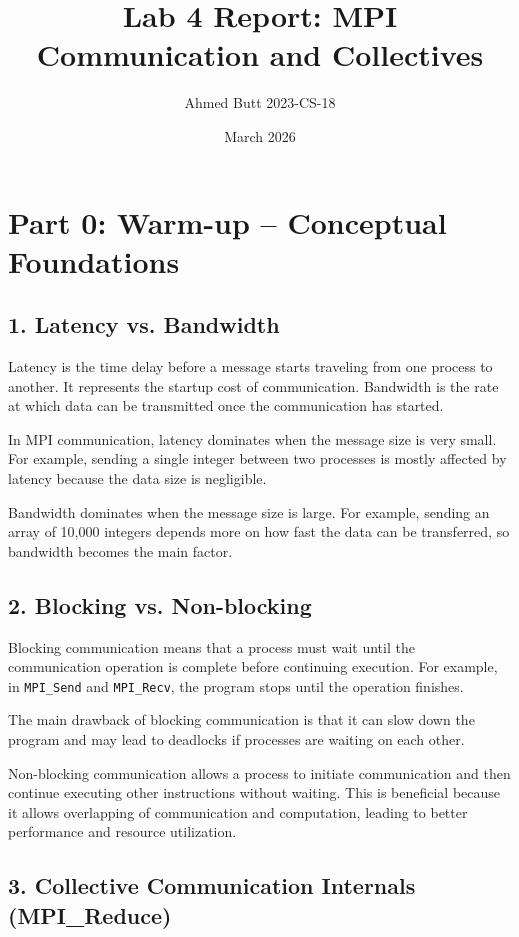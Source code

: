 \documentclass[a4paper,12pt]{article}
\title{Lab 4 Report: MPI Communication and Collectives}
\author{Ahmed Butt 2023-CS-18}
\date{March 2026}
\begin{document}
\maketitle
\section{Part 0: Warm-up -- Conceptual Foundations}

\subsection{1. Latency vs. Bandwidth}

Latency is the time delay before a message starts traveling from one process to another. It represents the startup cost of communication. Bandwidth is the rate at which data can be transmitted once the communication has started.

In MPI communication, latency dominates when the message size is very small. For example, sending a single integer between two processes is mostly affected by latency because the data size is negligible.

Bandwidth dominates when the message size is large. For example, sending an array of 10,000 integers depends more on how fast the data can be transferred, so bandwidth becomes the main factor.

\subsection{2. Blocking vs. Non-blocking}

Blocking communication means that a process must wait until the communication operation is complete before continuing execution. For example, in \texttt{MPI\_Send} and \texttt{MPI\_Recv}, the program stops until the operation finishes.

The main drawback of blocking communication is that it can slow down the program and may lead to deadlocks if processes are waiting on each other.

Non-blocking communication allows a process to initiate communication and then continue executing other instructions without waiting. This is beneficial because it allows overlapping of communication and computation, leading to better performance and resource utilization.

\subsection{3. Collective Communication Internals (MPI\_Reduce)}
\end{document}
